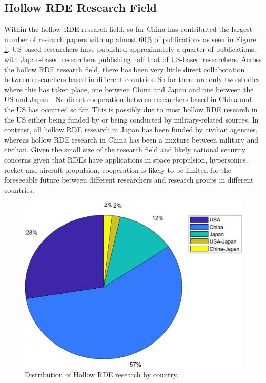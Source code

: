 \documentclass{article}
\begin{document}
\subsection{Hollow RDE Research Field}

Within the hollow RDE research field, so far China has contributed the largest number of research papers with up almost 60\% of publications as seen in Figure \ref{Fig.4}. US-based researchers have published approximately a quarter of publications, with Japan-based researchers publishing half that of US-based researchers.  Across the hollow RDE research field, there has been very little direct collaboration between researchers based in different countries. So far there are only two studies where this has taken place, one between China and Japan \cite{Xia2018} and one between the US and Japan \cite{Yokoo2021}. No direct cooperation between researchers based in China and the US has occurred so far. This is possibly due to most hollow RDE research in the US either being funded by or being conducted by military-related sources. In contrast, all hollow RDE research in Japan has been funded by civilian agencies, whereas hollow RDE research in China has been a mixture between military and civilian. Given the small size of the research field and likely national security concerns given that RDEs have applications in space propulsion, hypersonics, rocket and aircraft propulsion, cooperation is likely to be limited for the foreseeable future between different researchers and research groups in different countries.

\begin{figure}
\centering
\includegraphics[scale=0.75]{HRDEpubcountry.png}
\caption{Distribution of Hollow RDE research by country.}\label{Fig.4}
\end{figure}
\end{document}
